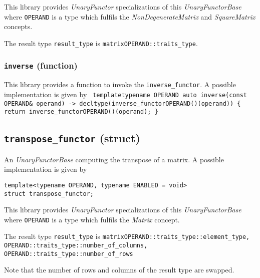 \documentclass[oneside]{book}
\begin{document}
\noindent{}\noindent{}This library provides \textit{UnaryFunctor} specializations of this \textit{UnaryFunctorBase}
where \texttt{OPERAND} is a type which fulfils the \textit{NonDegenerateMatrix} and \textit{SquareMatrix} concepts.
\newline

\noindent{}The result type \texttt{result\_type} is \texttt{matrix\textlangle OPERAND::traits\_type\textrangle}.

\subsubsection{\texttt{inverse} (function)}
This library provides a function to invoke the \texttt{inverse\_functor}.
A possible implementation is given by\newline
\texttt{
template\textlangle typename OPERAND\textrangle\newline
auto inverse(const OPERAND\& operand)\newline
-> decltype(inverse\_functor\textlangle OPERAND\textrangle()(operand))\newline
\{ return inverse\_functor\textlangle OPERAND\textrangle()(operand); \}
}

\subsection{\texttt{transpose\_functor} (struct)}
An \textit{UnaryFunctorBase} computing the transpose of a matrix.
A possible implementation is given by
\begin{verbatim}
template<typename OPERAND, typename ENABLED = void>
struct transpose_functor;
\end{verbatim}

\noindent{}This library provides \textit{UnaryFunctor} specializations of this
\textit{UnaryFunctorBase} where \texttt{OPERAND} is a type which fulfils   the
\textit{Matrix} concept.\newline

\noindent{}The result type \texttt{result\_type} is\newline
\texttt{matrix\textlangle   OPERAND::traits\_type::element\_type,\newline
\hphantom{matrix\textlangle}OPERAND::traits\_type::number\_of\_columns,\newline
\hphantom{matrix\textlangle}OPERAND::traits\_type::number\_of\_rows\textrangle}\newline

\noindent{}Note that the number of rows and columns of the result type are swapped.
\end{document}
